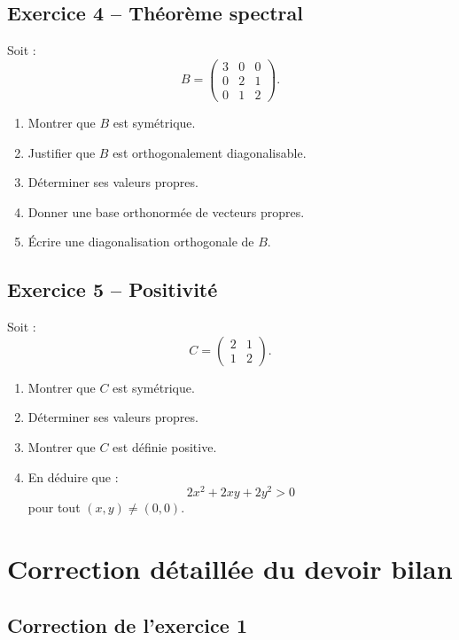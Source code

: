 \documentclass[11pt,a4paper]{article}
\begin{document}
\subsection*{Exercice 4 -- Théorème spectral}

Soit :
\[
B=
\begin{pmatrix}
3&0&0\\
0&2&1\\
0&1&2
\end{pmatrix}.
\]

\begin{enumerate}
    \item Montrer que \(B\) est symétrique.
    \item Justifier que \(B\) est orthogonalement diagonalisable.
    \item Déterminer ses valeurs propres.
    \item Donner une base orthonormée de vecteurs propres.
    \item Écrire une diagonalisation orthogonale de \(B\).
\end{enumerate}

\subsection*{Exercice 5 -- Positivité}

Soit :
\[
C=
\begin{pmatrix}
2&1\\
1&2
\end{pmatrix}.
\]
\begin{enumerate}
    \item Montrer que \(C\) est symétrique.
    \item Déterminer ses valeurs propres.
    \item Montrer que \(C\) est définie positive.
    \item En déduire que :
    \[
    2x^2+2xy+2y^2>0
    \]
    pour tout \((x,y)\neq(0,0)\).
\end{enumerate}

\newpage

\section{Correction détaillée du devoir bilan}

\subsection*{Correction de l'exercice 1}
\end{document}
